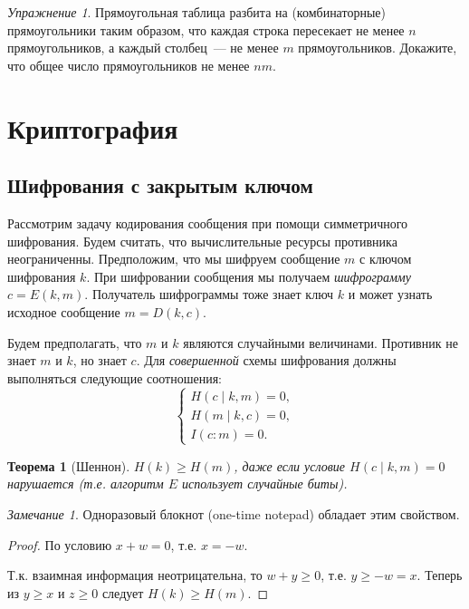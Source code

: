 \documentclass[12pt]{article}
\theoremstyle{definition}
\theoremstyle{plain}
\newtheorem{theorem}{Теорема}[section]
\theoremstyle{remark}
\newtheorem{exercise}{Упражнение}[section]
\newtheorem{remark}{Замечание}[section]
\begin{document}
\begin{exercise}
Прямоугольная таблица разбита на (комбинаторные) прямоугольники таким образом, что каждая строка пересекает не менее $n$ прямоугольников, а каждый столбец~--- не менее $m$ прямоугольников. Докажите, что общее число прямоугольников не менее $nm$.
\end{exercise}

\section{Криптография}
\subsection{Шифрования с закрытым ключом}

Рассмотрим задачу кодирования сообщения при помощи симметричного шифрования.
Будем считать, что вычислительные ресурсы противника неограниченны. 
Предположим, что мы шифруем сообщение $m$ с ключом шифрования $k$. При
шифровании сообщения мы получаем \emph{шифрограмму} $c = E(k, m)$.
Получатель шифрограммы тоже знает ключ $k$ и может узнать исходное
сообщение $m = D(k, c)$.

Будем предполагать, что $m$ и $k$ являются случайными 
величинами. Противник не знает $m$ и $k$, но знает $c$. Для \emph{совершенной}
схемы шифрования должны выполняться следующие соотношения:
\[
\begin{cases}
    H(c\mid k, m) = 0,\\
    H(m\mid k, c) = 0,\\
    I(c : m) = 0.
\end{cases}
\]

\begin{theorem}[Шеннон]
    $H(k)\ge H(m)$, даже если условие $H(c\mid k,m) = 0$ нарушается 
    (т.е. алгоритм $E$ использует случайные биты).
\end{theorem}     
\begin{remark}
    Одноразовый блокнот (one-time notepad) обладает этим свойством.
\end{remark}
\begin{proof}
    По условию $x + w = 0$, т.е. $x = -w$. 

    \begin{center}
    \end{center}
    Т.к. взаимная информация неотрицательна, то $w + y\ge 0$, т.е. 
    $y \ge -w = x$. Теперь из $y \ge x$ и $z\ge 0$ следует $H(k)\ge H(m)$.                                  
\end{proof}
\end{document}
